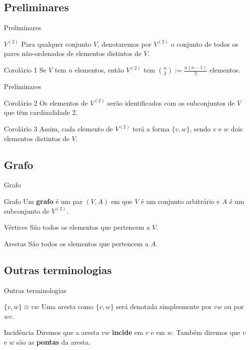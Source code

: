 \documentclass[xcolor=dvipsnames,table]{beamer}
\begin{document}
	\subsection{Preliminares}
	\begin{frame}{Preliminares}
		\begin{block}{$V^{(2)}$}
			Para qualquer conjunto $V$, denotaremos por $V^{(2)}$ o conjunto de todos os pares não-ordenados de elementos distintos de $V$.
		\end{block}
		\pause
		\begin{block}{Corolário 1}
			Se $V$ tem $n$ elementos, então $V^{(2)}$ tem ${n \choose 2} := \frac{n(n-1)}{2}$ elementos.
		\end{block}
	\end{frame}
	
	\begin{frame}{Preliminares}
		\begin{block}{Corolário 2}
			Os elementos de $V^{(2)}$ serão identificados com os subconjuntos de $V$ que têm cardinalidade 2.
		\end{block}
		\pause
		\begin{block}{Corolário 3}
			Assim, cada elemento de $V^{(2)}$ terá a forma $\{ v,w \}$, sendo $v$ e $w$ dois elementos distintos de $V$.
		\end{block}
	\end{frame}
	
	
	\subsection{Grafo}
	\begin{frame}{Grafo}
		\begin{block}{Grafo}
			Um {\bf grafo} é um par $(V,A)$ em que $V$ é um conjunto arbitrário e $A$ é um subconjunto de $V^{(2)}$.
		\end{block}
		\pause
		\begin{block}{Vértices}
			São todos os elementos que pertencem a $V$.
		\end{block}
		\pause
		\begin{block}{Arestas}
			São todos os elementos que pertencem a $A$.
		\end{block}
	\end{frame}
	
	\subsection{Outras terminologias}
	\begin{frame}{Outras terminologias}
		\begin{block}{$\{v,w\} \equiv vw$}
			Uma aresta como $\{v,w\}$ será denotada simplesmente por $vw$ ou por $wv$.
		\end{block}
		\pause
		\begin{block}{Incidência}
			Diremos que a aresta $vw$ {\bf incide} em $v$ e em $w$. Também diremos que $v$ e $w$ são as {\bf pontas} da aresta.
		\end{block}
	\end{frame}
	
\end{document}

